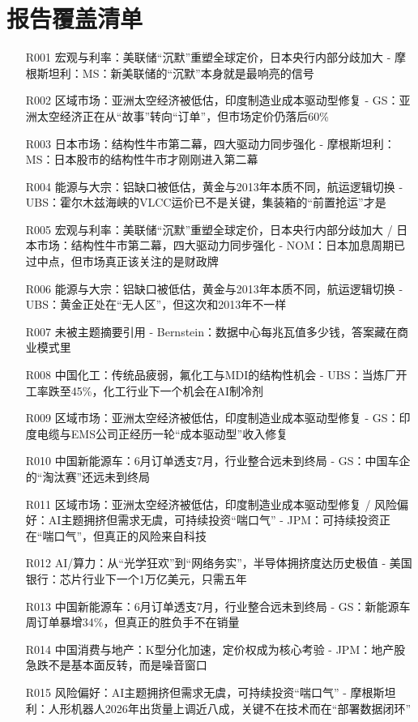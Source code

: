 \documentclass[11pt]{ctexart}
\begin{document}
\section{报告覆盖清单}
\begin{itemize}
  \item [R001] 宏观与利率：美联储“沉默”重塑全球定价，日本央行内部分歧加大 - 摩根斯坦利：MS：新美联储的“沉默”本身就是最响亮的信号
  \item [R002] 区域市场：亚洲太空经济被低估，印度制造业成本驱动型修复 - GS：亚洲太空经济正在从“故事”转向“订单”，但市场定价仍落后60\%
  \item [R003] 日本市场：结构性牛市第二幕，四大驱动力同步强化 - 摩根斯坦利：MS：日本股市的结构性牛市才刚刚进入第二幕
  \item [R004] 能源与大宗：铝缺口被低估，黄金与2013年本质不同，航运逻辑切换 - UBS：霍尔木兹海峡的VLCC运价已不是关键，集装箱的“前置抢运”才是
  \item [R005] 宏观与利率：美联储“沉默”重塑全球定价，日本央行内部分歧加大 / 日本市场：结构性牛市第二幕，四大驱动力同步强化 - NOM：日本加息周期已过中点，但市场真正该关注的是财政牌
  \item [R006] 能源与大宗：铝缺口被低估，黄金与2013年本质不同，航运逻辑切换 - UBS：黄金正处在“无人区”，但这次和2013年不一样
  \item [R007] 未被主题摘要引用 - Bernstein：数据中心每兆瓦值多少钱，答案藏在商业模式里
  \item [R008] 中国化工：传统品疲弱，氟化工与MDI的结构性机会 - UBS：当炼厂开工率跌至45\%，化工行业下一个机会在AI制冷剂
  \item [R009] 区域市场：亚洲太空经济被低估，印度制造业成本驱动型修复 - GS：印度电缆与EMS公司正经历一轮“成本驱动型”收入修复
  \item [R010] 中国新能源车：6月订单透支7月，行业整合远未到终局 - GS：中国车企的“淘汰赛”还远未到终局
  \item [R011] 区域市场：亚洲太空经济被低估，印度制造业成本驱动型修复 / 风险偏好：AI主题拥挤但需求无虞，可持续投资“喘口气” - JPM：可持续投资正在“喘口气”，但真正的风险来自科技
  \item [R012] AI/算力：从“光学狂欢”到“网络务实”，半导体拥挤度达历史极值 - 美国银行：芯片行业下一个1万亿美元，只需五年
  \item [R013] 中国新能源车：6月订单透支7月，行业整合远未到终局 - GS：新能源车周订单暴增34\%，但真正的胜负手不在销量
  \item [R014] 中国消费与地产：K型分化加速，定价权成为核心考验 - JPM：地产股急跌不是基本面反转，而是噪音窗口
  \item [R015] 风险偏好：AI主题拥挤但需求无虞，可持续投资“喘口气” - 摩根斯坦利：人形机器人2026年出货量上调近八成，关键不在技术而在“部署数据闭环”

\end{itemize}
\end{document}
